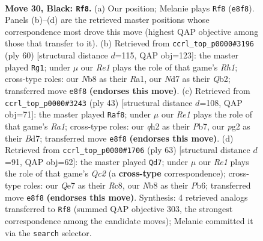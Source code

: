 \documentclass[11pt]{article}
\begin{document}
\clearpage

\begin{figure}[p]\centering
\begin{subfigure}{0.46\textwidth}\centering
\resizebox{\linewidth}{!}{%
\newchessgame
\chessboard[
  setfen={rn2r1k1/2pnq2p/1p2p1p1/p3Pp2/P2P1P1P/1RP2NN1/6PQ/3K1R2 b - - 2 30},
  showmover=false,
  pgfstyle=straightmove, color=movearrow, markmove={e8-f8}
]}
\caption{}
\end{subfigure}\hfill
\begin{subfigure}{0.46\textwidth}\centering
\resizebox{\linewidth}{!}{%
\newchessgame
\chessboard[
  setfen={4r3/3qn1k1/4np2/rp1p2p1/2pP3p/P1N1PN1P/1Q3PP1/R4K1R w - - 0 31},
  showmover=false,
  pgfstyle=straightmove, color=movearrow, markmove={h1-g1}
]}
\caption{}
\end{subfigure}
\\[4pt]
\begin{subfigure}{0.46\textwidth}\centering
\resizebox{\linewidth}{!}{%
\newchessgame
\chessboard[
  setfen={r5k1/1p1bnrp1/pqn1p2p/3pP2P/3P2P1/PP3N1R/4N3/1R1Q1B1K b - - 0 22},
  showmover=false,
  pgfstyle=straightmove, color=movearrow, markmove={a8-f8}
]}
\caption{}
\end{subfigure}\hfill
\begin{subfigure}{0.46\textwidth}\centering
\resizebox{\linewidth}{!}{%
\newchessgame
\chessboard[
  setfen={2r5/2q1kr1p/1p1p1ppP/n1nPp3/p1P1P1P1/P5R1/NP1N2Q1/1K3R2 b - - 7 32},
  showmover=false,
  pgfstyle=straightmove, color=movearrow, markmove={c7-d7}
]}
\caption{}
\end{subfigure}
\caption{\textbf{Move 30, Black: \texttt{Rf8}.} (a) Our position; Melanie plays \texttt{Rf8} (\texttt{e8f8}). Panels (b)--(d) are the retrieved master positions whose correspondence most drove this move (highest QAP objective among those that transfer to it). (b) Retrieved from \texttt{ccrl\_top\_p0000\#3196} (ply 60) [structural distance $d$=115, QAP obj=123]: the master played \texttt{Rg1}; under $\mu$ our \emph{Re1} plays the role of that game's \emph{Rh1}; cross-type roles: our \emph{N}b8 as their \emph{R}a1, our \emph{N}d7 as their \emph{Q}b2; transferred move \texttt{e8f8} \textbf{(endorses this move)}. (c) Retrieved from \texttt{ccrl\_top\_p0000\#3243} (ply 43) [structural distance $d$=108, QAP obj=71]: the master played \texttt{Raf8}; under $\mu$ our \emph{Re1} plays the role of that game's \emph{Ra1}; cross-type roles: our \emph{q}h2 as their \emph{P}b7, our \emph{p}g2 as their \emph{B}d7; transferred move \texttt{e8f8} \textbf{(endorses this move)}. (d) Retrieved from \texttt{ccrl\_top\_p0000\#1706} (ply 63) [structural distance $d$=91, QAP obj=62]: the master played \texttt{Qd7}; under $\mu$ our \emph{Re1} plays the role of that game's \emph{Qc2} (a \textbf{cross-type} correspondence); cross-type roles: our \emph{Q}e7 as their \emph{R}c8, our \emph{N}b8 as their \emph{P}b6; transferred move \texttt{e8f8} \textbf{(endorses this move)}. Synthesis: 4 retrieved analogs transferred to \texttt{Rf8} (summed QAP objective 303, the strongest correspondence among the candidate moves); Melanie committed it via the \texttt{search} selector.}
\label{fig:thought-m59}
\end{figure}
\end{document}
